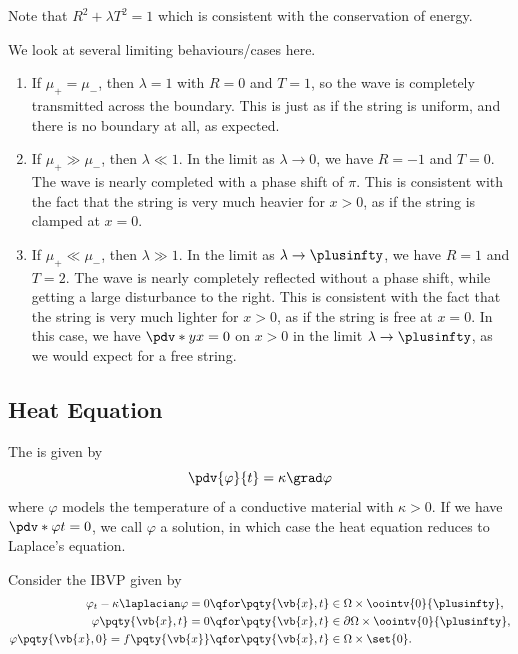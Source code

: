 {Note that \(R^2 + \lambda T^2 = 1\) which is consistent with the conservation of energy.

We look at several limiting behaviours/cases here.

\begin{enumerate}[label=(\roman*)]
    \item If \(\mu_+ = \mu_-\), then \(\lambda = 1\) with \(R = 0\) and \(T = 1\), so the wave is completely transmitted across the boundary. This is just as if the string is uniform, and there is no boundary at all, as expected.
    \item If \(\mu_+ \gg \mu_-\), then \(\lambda \ll 1\). In the limit as \(\lambda \to 0\), we have \(R = -1\) and \(T = 0\). The wave is nearly  completed with a phase shift of \(\pi\). This is consistent with the fact that the string is very much heavier for \(x > 0\), as if the string is clamped at \(x = 0\).
    \item If \(\mu_+ \ll \mu_-\), then \(\lambda \gg 1\). In the limit as \(\lambda \to \plusinfty\), we have \(R = 1\) and \(T = 2\). The wave is nearly completely reflected without a phase shift, while getting a large disturbance to the right. This is consistent with the fact that the string is very much lighter for \(x > 0\), as if the string is free at \(x = 0\). In this case, we have \(\pdv*{y}{x} = 0\) on \(x > 0\) in the limit \(\lambda \to \plusinfty\), as we would expect for a free string.
\end{enumerate}

\subsection{Heat Equation}

The  is given by
\begin{equation}
    \pdv{\varphi}{t} = \kappa \grad \varphi
\end{equation}
where \(\varphi\) models the temperature of a conductive material with  \(\kappa > 0\). If we have \(\pdv*{\varphi}{t} = 0\), we call \(\varphi\) a  solution, in which case the heat equation reduces to Laplace's equation.

Consider the IBVP given by
\begin{subequations}
    \begin{align}
        \varphi_t - \kappa \laplacian \varphi = 0 &\qfor \pqty{\vb{x}, t} \in \Omega \times \oointv{0}{\plusinfty}, \\
        \varphi\pqty{\vb{x}, t} = 0 &\qfor \pqty{\vb{x}, t} \in \partial \Omega \times \oointv{0}{\plusinfty}, \\
        \varphi\pqty{\vb{x}, 0} = f\pqty{\vb{x}} &\qfor \pqty{\vb{x}, t} \in \Omega \times \set{0}.
    \end{align}
\end{subequations}

}
